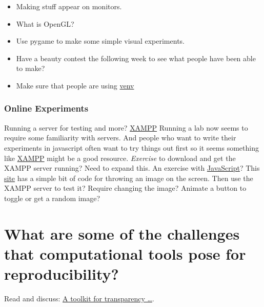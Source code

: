 \documentclass[
  letterpaper,
  DIV=11,
  numbers=noendperiod]{scrreprt}
\providecommand{\tightlist}{%
  \setlength{\itemsep}{0pt}\setlength{\parskip}{0pt}}\usepackage{longtable,booktabs,array}
\begin{document}
\begin{itemize}
\tightlist
\item
  Making stuff appear on monitors.
\item
  What is OpenGL?
\item
  Use pygame to make some simple visual experiments.
\item
  Have a beauty contest the following week to see what people have been
  able to make?
\item
  Make sure that people are using
  \href{https://python.land/virtual-environments/virtualenv}{venv}
\end{itemize}

\subsection{Online Experiments}\label{online-experiments}

Running a server for testing and more?
\href{https://www.apachefriends.org/index.html}{XAMPP} Running a lab now
seems to require some familiarity with servers. And people who want to
write their experiments in javascript often want to try things out first
so it seems something like
\href{https://www.apachefriends.org/download.html}{XAMPP} might be a
good resource. \emph{Exercise} to download and get the XAMPP server
running? Need to expand this. An exercise with
\href{https://code.visualstudio.com/Docs/languages/javascript}{JavaScript}?
This
\href{https://www.geeksforgeeks.org/how-to-display-images-in-javascript/}{site}
has a simple bit of code for throwing an image on the screen. Then use
the XAMPP server to test it? Require changing the image? Animate a
button to toggle or get a random image?


\chapter{What are some of the challenges that computational tools pose
for
reproducibility?}\label{what-are-some-of-the-challenges-that-computational-tools-pose-for-reproducibility}

\begin{tcolorbox}[enhanced jigsaw, opacityback=0, leftrule=.75mm, colback=white, left=2mm, titlerule=0mm, toprule=.15mm, toptitle=1mm, coltitle=black, title=\textcolor{quarto-callout-tip-color}{\faLightbulb}\hspace{0.5em}{Classroom Exercise}, opacitybacktitle=0.6, colbacktitle=quarto-callout-tip-color!10!white, breakable, bottomrule=.15mm, bottomtitle=1mm, colframe=quarto-callout-tip-color-frame, arc=.35mm, rightrule=.15mm]

Read and discuss:
\href{https://www.nature.com/articles/d41586-018-05990-5}{A toolkit for
transparency \ldots{}}.

\end{tcolorbox}
\end{document}
